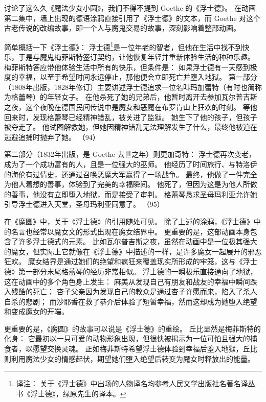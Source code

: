 
讨论了这么久《魔法少女小圆》，我们不得不提到 Goethe 的《浮士德》。
在动画第二集中，墙上出现的德语涂鸦直接引用了《浮士德》的文本，而 Goethe 对这个古老传说的改编故事，即一个人与魔鬼交易的故事，深刻影响着整部动画。

简单概括一下《浮士德》：
浮士德\footnote{%
    译注：
    关于《浮士德》中出场的人物译名均参考人民文学出版社名著名译丛书《浮士德》，绿原先生的译本。
}是一位年老的智者，但他在生活中找不到快乐，于是与魔鬼梅菲斯特签订契约，让他恢复年轻并重新体验生活的种种乐趣。
梅菲斯特答应带他体验生活中所有的快乐，但条件是：
如果浮士德有一天感到极度的幸福，以至于希望时间永远停止，那他便会立即死亡并堕入地狱。
第一部分（1808年出版，1828年修订）主要讲述浮士德追求一位名叫玛加蕾特（有时也简称为格蕾琴）的年轻女子。
在他杀死了她的兄弟后，他暂时离开去参加瓦尔普吉斯之夜，这个夜晚在德国民间传说中是魔女和恶魔在布罗肯山上狂欢的时刻。
等他回来时，发现格蕾琴已经精神错乱，被关进了监狱。
她生下了他的孩子，但孩子被夺走了。
他试图解救她，但她因精神错乱无法理解发生了什么，最终他被迫在逃避追捕时抛弃了她。
（94）

第二部分（1832年出版，是 Goethe 去世之年）则更加奇特：
浮士德再次变老，成为了一个成功富有的人，且是一位强大的巫师。
他经历了时间旅行、与特洛伊的海伦有过情史，还通过召唤恶魔大军赢得了一场战争。
最终，他做了一件完全为他人着想的善事，体验到了完美的幸福瞬间。
他死了，但因为这是为他人所做的善事，他没有立即堕入地狱，而是接受了审判。
格蕾琴恳求圣母玛利亚允许她引导浮士德进入天堂，圣母玛利亚同意了。
（95）

在《魔圆》中，关于《浮士德》的引用随处可见。
除了上述的涂鸦，《浮士德》中的名言也经常以魔女文的形式出现在魔女结界中。
更重要的是，这部动画本身包含了许多浮士德式的元素。
比如瓦尔普吉斯之夜，虽然在动画中是一位极其强大的魔女，但实际上它就像在《浮士德》中描述的一样，是许多魔女一起展开的邪恶狂欢。
魔女结界是通过她们的绝望和疯狂来覆盖现实所形成的牢笼，这与《浮士德》第一部分末尾格蕾琴的经历非常相似。
浮士德的一瞬极乐直接通向了地狱，这在动画中的多个角色身上发生：
麻美从发现自己有朋友和战友的幸福中瞬间跌入残酷的死亡；
杏子父亲因为发现自己的教众是通过杏子许愿而来，陷入了杀人自杀的悲剧；
而沙耶香在救了恭介后体验了短暂幸福，然而这却成为她堕入绝望和变成魔女的开端。

更重要的是，《魔圆》的故事可以说是《浮士德》的重绘。
丘比显然是梅菲斯特的化身：
它最初以一只可爱的动物形象出现，但很快被揭示为一位可怕且强大的捕食者，以愿望交换灵魂。
正如梅菲斯特希望浮士德体验到幸福后堕入地狱，丘比则利用魔法少女的情感起伏，期望她们堕入绝望后转变为魔女时释放出的能量。

